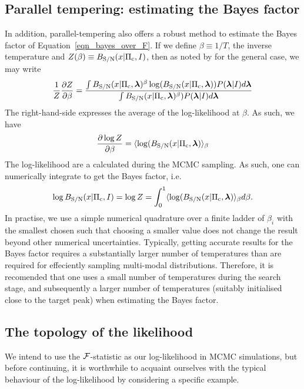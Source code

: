 \documentclass[aps, prd, twocolumn, superscriptaddress, floatfix, showpacs, nofootinbib, longbibliography]{revtex4-1}
\begin{document}
\subsection{Parallel tempering: estimating the Bayes factor}
In addition, parallel-tempering also offers a robust method to estimate the
Bayes factor of Equation~\eqref{eqn_bayes_over_F}. If we define
$\beta\equiv1/T$, the inverse temperature and $Z(\beta)\equiv B_{\rm S/N}(x| \Pi_{\rm
c}, I)$, then as noted by \citet{goggans2004} for the general case, we may
write
\begin{align}
\frac{1}{Z} \frac{\partial Z}{\partial \beta}=
\frac{
\int B_{\rm S/N}(x| \Pi_{\rm c}, \boldsymbol{\mathbf{\lambda}})^{\beta}
\log(B_{\rm S/N}(x| \Pi_{\rm c}, \boldsymbol{\mathbf{\lambda}}))P(\boldsymbol{\mathbf{\lambda}}| I)
d\boldsymbol{\mathbf{\lambda}}
}
{
\int B_{\rm S/N}(x| \Pi_{\rm c}, \boldsymbol{\mathbf{\lambda}})^{\beta})P(\boldsymbol{\mathbf{\lambda}}| I)
d\boldsymbol{\mathbf{\lambda}}
}
\end{align}
The right-hand-side expresses the average of the log-likelihood at $\beta$. As
such, we have
\begin{align}
\frac{\partial \log Z}{\partial \beta} = 
\langle \log(B_{\rm S/N}(x| \Pi_{\rm c}, \boldsymbol{\mathbf{\lambda}}) \rangle_{\beta}
\end{align}
The log-likelihood are a calculated during the MCMC sampling. As such, one
can numerically integrate to get the Bayes factor, i.e.
\begin{align}
\log B_{\rm S/N}(x| \Pi_{\rm c}, I) = \log Z = \int_{0}^{1}
\langle \log(B_{\rm S/N}(x| \Pi_{\rm c}, \boldsymbol{\mathbf{\lambda}}) \rangle_{\beta} d\beta.
\end{align}
In practise, we use a simple numerical quadrature over a finite ladder of
$\beta_i$ with the smallest chosen such that choosing a smaller value does not
change the result beyond other numerical uncertainties. Typically, getting
accurate results for the Bayes factor requires a substantially larger number of
temperatures than are required for effeciently sampling multi-modal
distributions.  Therefore, it is recomended that one uses a small number of
temperatures during the search stage, and subsequently a larger number of
temperatures (suitably initialised close to the target peak) when estimating
the Bayes factor.

\subsection{The topology of the likelihood}

We intend to use the ${\mathcal{F}}$-statistic as our log-likelihood in MCMC simulations,
but before continuing, it is worthwhile to acquaint ourselves with the typical
behaviour of the log-likelihood by considering a specific example.
\end{document}
